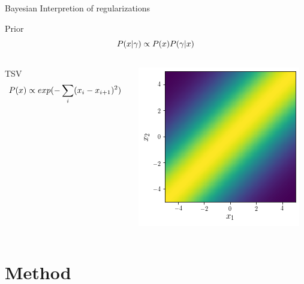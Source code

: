 \documentclass[10pt]{beamer}
\begin{document}
\begin{frame}{Bayesian Interpretion of regularizations}
\begin{alertblock}{Prior}
\begin{equation}\notag
P(x|\gamma) \propto P(x)P(\gamma|x)
\end{equation}
\end{alertblock}

\begin{columns}
\begin{column}{0.5\textwidth}
\begin{alertblock}{TSV}
\begin{equation}\notag
P(x) \propto exp(-\sum_i (x_i-x_{i+1})^2)
\end{equation}
\end{alertblock}
\end{column}
\begin{column}{0.6\textwidth}
\centering
\includegraphics[height=.8\textwidth]{prior_TSV.png}
\end{column}
\end{columns}
\end{frame}

\section{Method}
\end{document}
